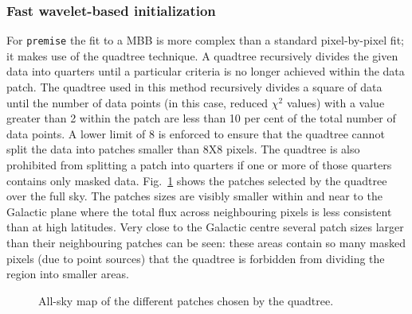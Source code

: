 \documentclass[a4paper,fleqn,usenatbib]{mnras}
\begin{document}
\subsubsection{Fast wavelet-based initialization}

For {\texttt{premise}} the fit to a MBB is more complex than a standard pixel-by-pixel fit; it makes use of the quadtree technique. A quadtree recursively divides the given data into quarters until a particular criteria is no longer achieved within the data patch. The quadtree used in this method recursively divides a square of data until the number of data points (in this case, reduced $\chi^{2}$ values) with a value greater than 2 within the patch are less than 10 per cent of the total number of data points. A lower limit of 8 is enforced to ensure that the quadtree cannot split the data into patches smaller than 8X8 pixels. The quadtree is also prohibited from splitting a patch into quarters if one or more of those quarters contains only masked data. Fig.~\ref{fig:patches} shows the patches selected by the quadtree over the full sky. The patches sizes are visibly smaller within and near to the Galactic plane where the total flux across neighbouring pixels is less consistent than at high latitudes. Very close to the Galactic centre several patch sizes larger than their neighbouring patches can be seen: these areas contain so many masked pixels (due to point sources) that the quadtree is forbidden from dividing the region into smaller areas. 

\begin{figure}
\centering
{}
\caption{All-sky map of the different patches chosen by the quadtree.}
\label{fig:patches}
\end{figure}
\end{document}

